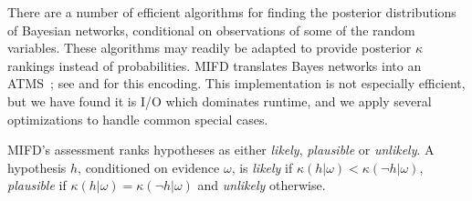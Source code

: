 There are a number of efficient algorithms for finding the posterior distributions of Bayesian networks, 
conditional on observations of some of the random variables. These algorithms may readily be adapted to 
provide posterior $\kappa$ rankings instead of probabilities.
MIFD translates Bayes networks into an
ATMS~\cite{Forbus+DeKleer:1993}; see \cite{Charniak:88,Poole:93,provan-ijcai89}
and  for this encoding.
This implementation is not especially efficient, but we have found
it is I/O which dominates runtime, and we apply several optimizations to
handle common special cases.
%

MIFD's assessment ranks hypotheses as either
\emph{likely}, \emph{plausible} or \emph{unlikely}. A hypothesis $h$,
conditioned on evidence $\omega$,
is \emph{likely} if
$\kappa(h|\omega) < \kappa(\neg h|\omega)$, \emph{plausible} if $\kappa(h|\omega) = \kappa(\neg h|\omega)$
and \emph{unlikely} otherwise.

